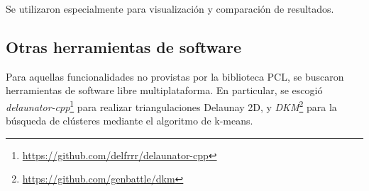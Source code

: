 	Se utilizaron especialmente para visualización y comparación de resultados.

	\subsection{Otras herramientas de software}
	Para aquellas funcionalidades no provistas por la biblioteca PCL, se buscaron herramientas de software libre multiplataforma.
	En particular, se escogió \emph{delaunator-cpp}\footnote{\url{https://github.com/delfrrr/delaunator-cpp}} para realizar triangulaciones Delaunay 2D,
	y \emph{DKM}\footnote{\url{https://github.com/genbattle/dkm}} para la búsqueda de clústeres mediante el algoritmo de k-means.
